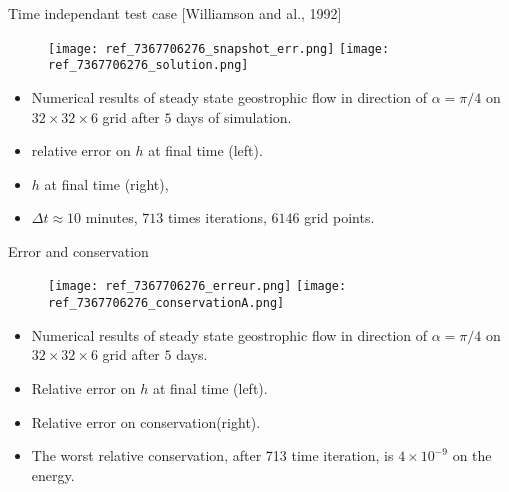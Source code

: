 \documentclass[11pt]{beamer}
\begin{document}
\begin{frame}{Time independant test case [Williamson and al., 1992]}
\begin{figure}
\texttt{[image: ref\_7367706276\_snapshot\_err.png]}
\texttt{[image: ref\_7367706276\_solution.png]}
\end{figure}
\begin{itemize}
\item Numerical results of steady state geostrophic flow in direction of $\alpha=\pi/4$ on  $32 \times 32 \times 6$ grid after $5$ days of simulation.
\item relative error on $h$ at final time (left).
\item $h$ at final time (right),
\item $\Delta t \approx
10$ minutes, $713$ times iterations, $6146$ grid points.
\end{itemize}

\end{frame}

\begin{frame}{Error and conservation}
\begin{figure}
\texttt{[image: ref\_7367706276\_erreur.png]}
\texttt{[image: ref\_7367706276\_conservationA.png]}
\end{figure}
\begin{itemize}
\item Numerical results of steady state geostrophic flow in direction of $\alpha=\pi/4$ on  $32 \times 32 \times 6$ grid after $5$ days.
\item Relative error on $h$ at final time (left).
\item Relative error on conservation(right).
\item The worst relative conservation, after 713 time iteration, is $4 \times 10^{-9}$ on the energy.
\end{itemize}
\end{frame}
\end{document}
